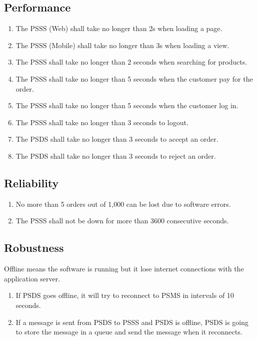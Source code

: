 \subsection{Performance}
\begin{enumerate}[label=PER-\arabic*]
    \item The PSSS (Web) shall take no longer than 2s when loading a page.
    \item The PSSS (Mobile) shall take no longer than 3s when loading a view. 
    \item The PSSS shall take no longer than 2 seconds when searching for 
    products.
    \item The PSSS shall take no longer than 5 seconds when the customer 
    pay for the order.
    \item The PSSS shall take no longer than 5 seconds when the customer 
    log in.
    \item The PSSS shall take no longer than 3 seconds to logout.
    \item The PSDS shall take no longer than 3 seconds to accept an order.
    \item The PSDS shall take no longer than 3 seconds to reject an order.
    
\end{enumerate}

\subsection{Reliability}
\begin{enumerate}[label=REL-\arabic*]
    \item No more than 5 orders out of 1,000 can be lost due to software errors.
    \item The PSSS shall not be down for more than 3600 consecutive seconds.
\end{enumerate}
\subsection{Robustness}
Offline means the software is running but it lose internet connections 
with the application server.

\begin{enumerate}[label=ROB-\arabic*]
    \item If PSDS goes offline, it will try to reconnect to PSMS in 
    intervals of 10 seconds.
    \item If a message is sent from PSDS to PSSS and PSDS is offline, PSDS is 
    going to store the message in a queue and send the message 
    when it reconnects.
\end{enumerate}

